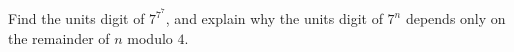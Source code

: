 Find the units digit of $7^{7^7}$, and explain why the units digit of $7^n$ depends only on the remainder of $n$ modulo $4$.
